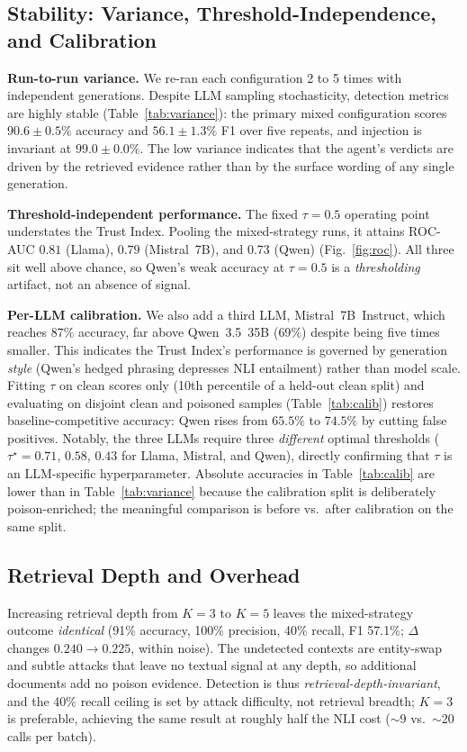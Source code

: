 \subsection{Stability: Variance, Threshold-Independence, and Calibration}
\label{sec:stability}



\textbf{Run-to-run variance.} We re-ran each configuration 2 to 5 times with independent generations. Despite LLM sampling stochasticity, detection metrics are highly stable (Table~\ref{tab:variance}): the primary mixed configuration scores $90.6{\pm}0.5\%$ accuracy and $56.1{\pm}1.3\%$ F1 over five repeats, and injection is invariant at $99.0{\pm}0.0\%$. The low variance indicates that the agent's verdicts are driven by the retrieved evidence rather than by the surface wording of any single generation.

\textbf{Threshold-independent performance.} The fixed $\tau{=}0.5$ operating point understates the Trust Index. Pooling the mixed-strategy runs, it attains ROC-AUC $0.81$ (Llama), $0.79$ (Mistral~7B), and $0.73$ (Qwen) (Fig.~\ref{fig:roc}). All three sit well above chance, so Qwen's weak accuracy at $\tau{=}0.5$ is a \emph{thresholding} artifact, not an absence of signal.

\textbf{Per-LLM calibration.} We also add a third LLM, Mistral~7B~Instruct, which reaches $87\%$ accuracy, far above Qwen~3.5~35B ($69\%$) despite being five times smaller. This indicates the Trust Index's performance is governed by generation \emph{style} (Qwen's hedged phrasing depresses NLI entailment) rather than model scale. Fitting $\tau$ on clean scores only (10th percentile of a held-out clean split) and evaluating on disjoint clean and poisoned samples (Table~\ref{tab:calib}) restores baseline-competitive accuracy: Qwen rises from $65.5\%$ to $74.5\%$ by cutting false positives. Notably, the three LLMs require three \emph{different} optimal thresholds ($\tau^\star{=}0.71$, $0.58$, $0.43$ for Llama, Mistral, and Qwen), directly confirming that $\tau$ is an LLM-specific hyperparameter. Absolute accuracies in Table~\ref{tab:calib} are lower than in Table~\ref{tab:variance} because the calibration split is deliberately poison-enriched; the meaningful comparison is before vs.\ after calibration on the same split.

\subsection{Retrieval Depth and Overhead}
Increasing retrieval depth from $K{=}3$ to $K{=}5$ leaves the mixed-strategy outcome \emph{identical} (91\% accuracy, 100\% precision, 40\% recall, F1 57.1\%; $\Delta$ changes $0.240\!\to\!0.225$, within noise). The undetected contexts are entity-swap and subtle attacks that leave no textual signal at any depth, so additional documents add no poison evidence. Detection is thus \emph{retrieval-depth-invariant}, and the 40\% recall ceiling is set by attack difficulty, not retrieval breadth; $K{=}3$ is preferable, achieving the same result at roughly half the NLI cost ($\sim$9 vs.\ $\sim$20 calls per batch).

